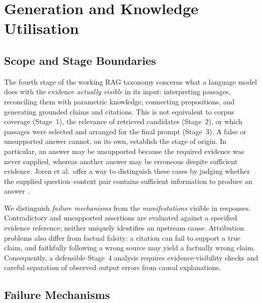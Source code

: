 \section{Generation and Knowledge Utilisation}
\label{sec:generation-knowledge-utilisation}

\subsection{Scope and Stage Boundaries}
\label{subsec:s9-scope}

The fourth stage of the working RAG taxonomy concerns what a language model does with the evidence \emph{actually visible} in its input: interpreting passages, reconciling them with parametric knowledge, connecting propositions, and generating grounded claims and citations. This is not equivalent to corpus coverage (Stage~1), the relevance of retrieved candidates (Stage~2), or which passages were selected and arranged for the final prompt (Stage~3). A false or unsupported answer cannot, on its own, establish the stage of origin. In particular, an answer may be unsupported because the required evidence was never supplied, whereas another answer may be erroneous despite sufficient evidence. Joren et al.\ offer a way to distinguish these cases by judging whether the supplied question--context pair contains sufficient information to produce an answer \cite[Secs.~3--4]{joren2025sufficient}.

We distinguish \emph{failure mechanisms} from the \emph{manifestations} visible in responses. Contradictory and unsupported assertions are evaluated against a specified evidence reference; neither uniquely identifies an upstream cause. Attribution problems also differ from factual falsity: a citation can fail to support a true claim, and faithfully following a wrong source may yield a factually wrong claim. Consequently, a defensible Stage~4 analysis requires evidence-visibility checks and careful separation of observed output errors from causal explanations.

\subsection{Failure Mechanisms}
\label{subsec:s9-mechanisms}

